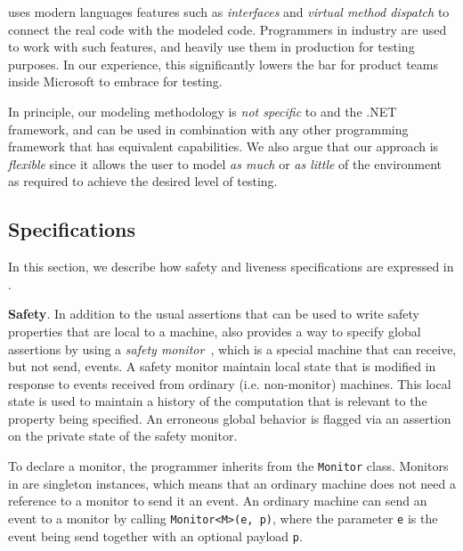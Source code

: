 \psharp uses modern languages features such as \emph{interfaces} and \emph{virtual method dispatch} to connect the real code with the modeled code. Programmers in industry are used to work with such features, and heavily use them in production for testing purposes. In our experience, this significantly lowers the bar for product teams inside Microsoft to embrace \psharp for testing.

In principle, our modeling methodology is \emph{not specific} to \psharp and the .NET framework, and can be used in combination with any other programming framework that has equivalent capabilities. We also argue that our approach is \emph{flexible} since it allows the user to model \emph{as much} or \emph{as little} of the environment as required to achieve the desired level of testing.

\subsection{Specifications}
\label{sec:bg:bugs}

In  this section, we describe how safety and liveness specifications are expressed in \psharp.

\textbf{Safety}.
In addition to the usual assertions that can be used to write safety properties that are local to a machine, \psharp also provides a way to specify global assertions by using a \emph{safety monitor}~\cite{desai2015building}, which is a special machine that can receive, but not send, events. A safety monitor maintain local state that is modified in response to events received from ordinary (i.e. non-monitor) machines. This local state is used to maintain a history of the computation that is relevant to the property being specified. An erroneous global behavior is flagged via an assertion on the private state of the safety monitor.

To declare a monitor, the programmer inherits from the \psharp \texttt{Monitor} class. Monitors in \psharp are singleton instances, which means that an ordinary machine does not need a reference to a monitor to send it an event. An ordinary machine can send an event to a monitor by calling \texttt{Monitor<M>(e, p)}, where the parameter \texttt{e} is the event being send together with an optional payload \texttt{p}.

